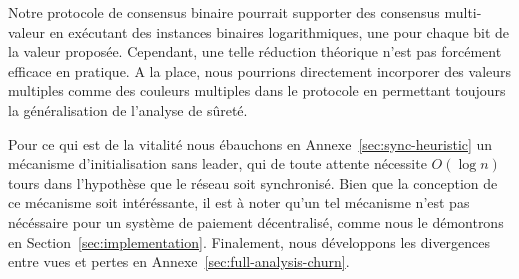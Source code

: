 \documentclass[letterpaper,twocolumn,10pt]{article}
\newcommand{\Oh}[1]{O(#1)}
\theoremstyle{definition}
\begin{document}
Notre protocole de consensus binaire pourrait supporter des consensus multi-valeur en exécutant des instances binaires
logarithmiques, une pour chaque bit de la valeur proposée. Cependant, une telle réduction théorique n'est pas
forcément efficace en pratique. A la place, nous pourrions directement incorporer des valeurs multiples comme des
couleurs multiples dans le protocole en permettant toujours la généralisation de l'analyse de sûreté.

Pour ce qui est de la vitalité nous ébauchons en Annexe~\ref{sec:sync-heuristic} un mécanisme d'initialisation sans
leader, qui de toute attente nécessite $\Oh{\log{n}}$ tours dans l'hypothèse que le réseau soit synchronisé. Bien que
la conception de ce mécanisme soit intéréssante, il est à noter qu'un tel mécanisme n'est pas nécéssaire pour un système
de paiement décentralisé, comme nous le démontrons en Section~\ref{sec:implementation}.
Finalement, nous développons les divergences entre vues et pertes en Annexe~\ref{sec:full-analysis-churn}.

\end{document}

